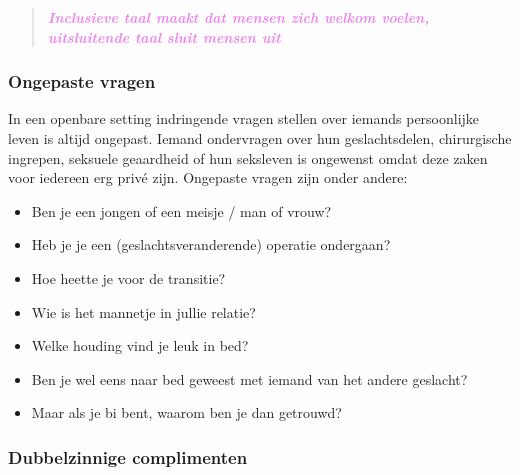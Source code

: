\documentclass[12pt,openany]{book}
\begin{document}
\begin{quote}
\centering
\doublespacing
\textit{\Large \textcolor{violet}{\textbf{Inclusieve taal maakt dat mensen zich welkom voelen, uitsluitende taal sluit mensen uit}}}
\end{quote}


\begin{figure}[h]
    \centering
\end{figure}

\subsubsection*{Ongepaste vragen}

In een openbare setting indringende vragen stellen over iemands persoonlijke leven is altijd ongepast. Iemand ondervragen over hun geslachtsdelen, chirurgische ingrepen, seksuele geaardheid of hun seksleven is ongewenst omdat deze zaken voor iedereen erg privé zijn. Ongepaste vragen zijn onder andere: 

\begin{itemize}
  \setlength\itemsep{-0.3em}
  \item Ben je een jongen of een meisje / man of vrouw?
  \item Heb je je een (geslachtsveranderende) operatie ondergaan?
  \item Hoe heette je voor de transitie?
  \item Wie is het mannetje in jullie relatie?
  \item Welke houding vind je leuk in bed?
  \item Ben je wel eens naar bed geweest met iemand van het andere geslacht?
  \item Maar als je bi bent, waarom ben je dan getrouwd?
\end{itemize}

\subsubsection*{Dubbelzinnige complimenten}
\end{document}
